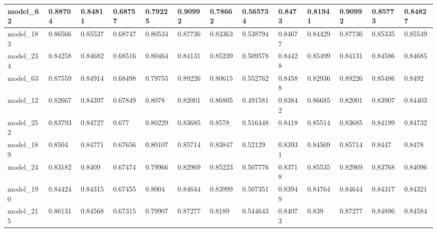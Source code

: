 \begin{tabular}{|l|l|l|l|l|l|l|l|l|l|l|l|l|}
model\_62      & 0.88704     & 0.84811        & 0.68757      & 0.79225          & 0.90992              & 0.78662              & 0.565734     & 0.8473            & 0.81941            & 0.90992         & 0.85773     & 0.84827      \\ \hline
model\_183     & 0.86566     & 0.85537        & 0.68747      & 0.80534          & 0.87736              & 0.83363              & 0.538794     & 0.84677           & 0.84429            & 0.87736         & 0.85335     & 0.85549      \\ \hline
model\_234     & 0.84258     & 0.84682        & 0.68516      & 0.80464          & 0.84131              & 0.85239              & 0.509578     & 0.84428           & 0.85499            & 0.84131         & 0.84586     & 0.84685      \\ \hline
model\_63      & 0.87559     & 0.84914        & 0.68498      & 0.79755          & 0.89226              & 0.80615              & 0.552762     & 0.84588           & 0.82936            & 0.89226         & 0.85486     & 0.8492       \\ \hline
model\_12      & 0.82667     & 0.84397        & 0.67849      & 0.8078           & 0.82001              & 0.86805              & 0.491581     & 0.83842           & 0.86685            & 0.82001         & 0.83907     & 0.84403      \\ \hline
model\_252     & 0.83793     & 0.84727        & 0.677        & 0.80229          & 0.83685              & 0.8578               & 0.516448     & 0.8418            & 0.85514            & 0.83685         & 0.84199     & 0.84732      \\ \hline
model\_189     & 0.8504      & 0.84771        & 0.67656      & 0.80107          & 0.85714              & 0.83847              & 0.52129      & 0.83931           & 0.84569            & 0.85714         & 0.8447      & 0.8478       \\ \hline
model\_24      & 0.83182     & 0.8409         & 0.67474      & 0.79966          & 0.82969              & 0.85223              & 0.507776     & 0.83718           & 0.85535            & 0.82969         & 0.83768     & 0.84096      \\ \hline
model\_190     & 0.84424     & 0.84315        & 0.67455      & 0.8004           & 0.84644              & 0.83999              & 0.507351     & 0.83949           & 0.84764            & 0.84644         & 0.84317     & 0.84321      \\ \hline
model\_215     & 0.86131     & 0.84568        & 0.67315      & 0.79907          & 0.87277              & 0.8189               & 0.544643     & 0.84073           & 0.839              & 0.87277         & 0.84896     & 0.84584      \\ \hline

\end{tabular}
